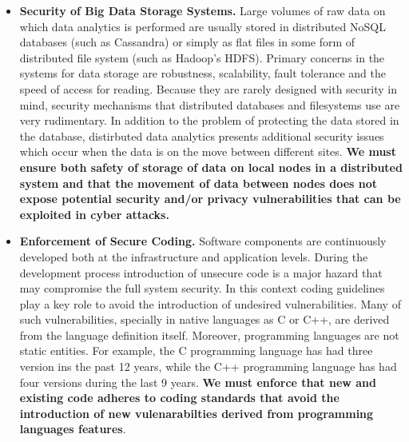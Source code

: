 \documentclass[a4paper,11pt]{article}
\begin{document}
\begin{itemize}
\item \textbf{Security of Big Data Storage Systems.} Large volumes of raw data on which data analytics is performed are usually stored in distributed NoSQL databases (such as Cassandra) or simply as flat files in some form of distributed file system (such as Hadoop's HDFS). Primary concerns in the systems for data storage are robustness, scalability, fault tolerance and the speed of access for reading. Because they are rarely designed with security in mind, security mechanisms that distributed databases and filesystems use are very rudimentary. In addition to the problem of protecting the data stored in the database, distirbuted data analytics presents additional security issues which occur when the data is on the move between different sites. \textbf{We must ensure both safety of storage of data on local nodes in a distributed system and that the movement of data between nodes does not expose potential security and/or privacy vulnerabilities that can be exploited in cyber attacks.}

\item \textbf{Enforcement of Secure Coding.} Software components are continuously developed both at the infrastructure and application levels. During the development process introduction of unsecure code is a major hazard that may compromise the full system security. In this context coding guidelines play a key role to avoid the introduction of undesired vulnerabilities. Many of such vulnerabilities, specially in native languages as C or C++, are derived from the language definition itself. Moreover, programming languages are not static entities. For example, the C programming language has had three version ins the past 12 years, while the C++ programming language has had four versions during the last 9 years. \textbf{We must enforce that new and existing code adheres to coding standards that avoid the introduction of new vulenarabilties derived from programming languages features}. 


\end{itemize}
\end{document}
